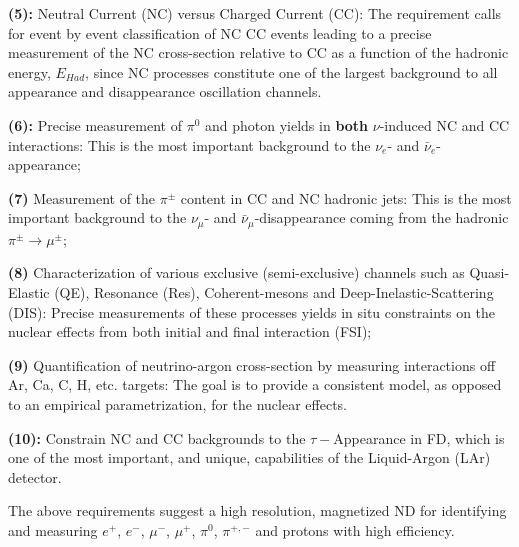 \vspace{0.25cm} 
\noindent
{\bf (5):} Neutral Current (NC) versus Charged Current (CC): 
The requirement calls for event by event classification of NC  
CC events leading to a precise measurement of 
the NC cross-section relative to 
CC as a function of the hadronic energy, $E_{Had}$, since NC processes 
constitute one of the largest background to all appearance and disappearance oscillation 
channels.

\vspace{0.25cm} 
\noindent
{\bf (6):} Precise measurement 
of $\pi^0$ and photon yields  in {\bf both}  $\nu$-induced 
NC and CC interactions: This is the most important background to the $\nu_e$- and $\bar \nu_e$-appearance; 


\vspace{0.25cm} 
\noindent
{\bf (7)} Measurement of the $\pi^{\pm}$ content in 
CC and NC hadronic jets:  This is the most important background to 
the $\nu_\mu$- and $\bar \nu_\mu$-disappearance coming from  the hadronic   $\pi^{\pm} \rightarrow \mu^{\pm}$; 

\vspace{0.25cm} 
\noindent
{\bf (8)} Characterization of various exclusive (semi-exclusive) 
channels such as Quasi-Elastic (QE), Resonance (Res), 
Coherent-mesons and Deep-Inelastic-Scattering (DIS): 
Precise measurements of these processes yields  
 in situ constraints on the nuclear effects from both initial and final interaction (FSI); 

\vspace{0.25cm} 
\noindent 
{\bf (9)} Quantification of neutrino-argon cross-section 
by measuring interactions off Ar, Ca, C, H, etc. targets: The goal is to provide 
a consistent model, as opposed to an empirical parametrization, for the nuclear effects. 



\vspace{0.25cm} 
\noindent 
{\bf (10):} Constrain NC and CC backgrounds to the {\boldmath $\tau-$}Appearance in FD, 
which is one of the most important, and unique, capabilities of the Liquid-Argon (LAr) detector. 

\noindent
The above requirements suggest a high resolution, magnetized ND for identifying and 
measuring $e^+$, $e^-$, $\mu^-$, $\mu^+$, $\pi^0$, $\pi^{+,-}$ and protons  with high efficiency. 



